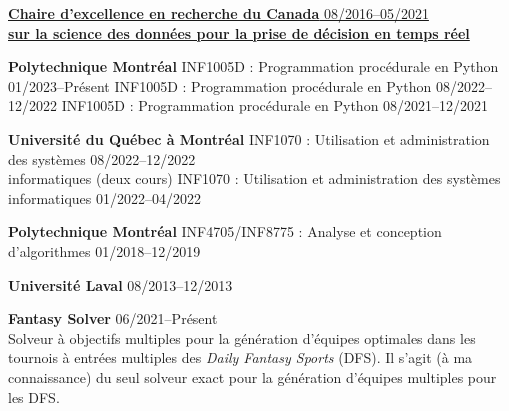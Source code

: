 \documentclass{memoir}
\begin{document}
\begin{list}{}
  \Item \href{http://cerc-datascience.polymtl.ca/person/philippe-olivier}{\textbf{Chaire d'excellence en recherche du Canada} \hfill 08/2016--05/2021 \\ \textbf{sur la science des données pour la prise de décision en temps réel}}
  



  \Item \textbf{Polytechnique Montréal}
  \BulletItem INF1005D : Programmation procédurale en Python \hfill 01/2023--Présent
  \BulletItem INF1005D : Programmation procédurale en Python \hfill 08/2022--12/2022
  \BulletItem INF1005D : Programmation procédurale en Python \hfill 08/2021--12/2021

  \Item \textbf{Université du Québec à Montréal}
  \BulletItem INF1070 : Utilisation et administration des systèmes \hfill 08/2022--12/2022 \\ informatiques (deux cours)
  \BulletItem INF1070 : Utilisation et administration des systèmes informatiques \hfill 01/2022--04/2022



  \Item \textbf{Polytechnique Montréal}
  \BulletItem INF4705/INF8775 : Analyse et conception d'algorithmes \hfill 01/2018--12/2019

  \Item \textbf{Université Laval} \hfill 08/2013--12/2013



  \Item \textbf{Fantasy Solver} \hfill 06/2021--Présent \\
  Solveur à objectifs multiples pour la génération d'équipes optimales dans les tournois à entrées multiples des \emph{Daily Fantasy Sports} (DFS). Il s'agit (à ma connaissance) du seul solveur exact pour la génération d'équipes multiples pour les DFS.
  
\end{list}
\par
\end{document}
